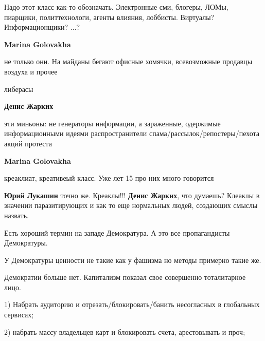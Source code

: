  
 
 
 
 
\zzSecCmt

\begin{itemize} %
Надо этот класс как-то обозначать.
Электронные сми, блогеры, ЛОМы, пиарщики, политтехнологи, агенты влияния, лоббисты.
Виртуалы?
Информационщики?
...?

\begin{itemize} %
\textbf{Marina Golovakha} 

не только они. На майданы бегают офисные хомячки, всевозможные продавцы воздуха
и прочее

либерасы

\textbf{Денис Жарких} 

эти миньоны: не генераторы информации, а зараженные, одержимые информационными
идеями распространители спама/рассылок/репостеры/пехота акций протеста

\textbf{Marina Golovakha} 

креаклиат, креативеый класс. Уже лет 15 про них много говорится

\textbf{Юрий Лукашин} точно же.
Креаклы!!!
\textbf{Денис Жарких}, что думаешь?
Клеаклы в значении паразитирующих и как то еще нормальных людей, создающих смыслы назвать.

Есть хороший термин на западе Демократура. А это все пропагандисты Демократуры.

У Демократуры ценности не такие как у фашизма но методы примерно такие же.

\end{itemize} %


Демократии больше нет. Капитализм показал свое совершенно тоталитарное лицо.

1) Набрать аудиторию и отрезать/блокировать/банить несогласных в глобальных
сервисах;

2) набрать массу владельцев карт и блокировать счета, арестовывать и проч;


\end{itemize}
